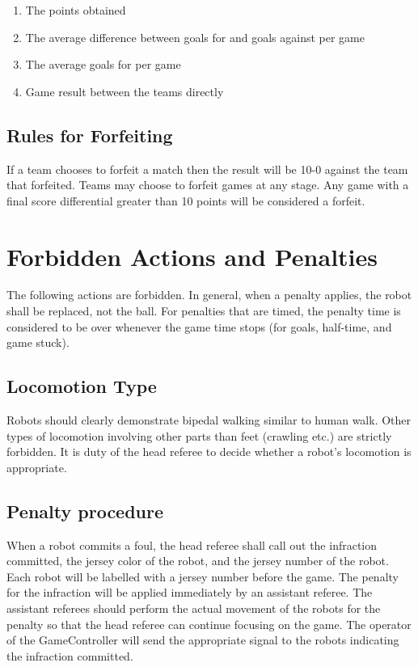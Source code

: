 \documentclass[12pt]{article}
\begin{document}
\begin{enumerate}
\item The points obtained
\item The average difference between goals for and goals against per game
\item The average goals for per game
\item Game result between the teams directly
\end{enumerate}


\subsection{Rules for Forfeiting}

If a team chooses to forfeit a match then the result will be 10-0 against the
team that forfeited. Teams may choose to forfeit games at any stage. Any game
with a final score differential greater than 10 points will be considered a forfeit.

\section{Forbidden Actions and Penalties}
\label{sec:forbidden_act}

The following actions are forbidden. In general, when a penalty
applies, the robot shall be replaced, not the ball.  For penalties
that are timed, the penalty time is considered to be over whenever
the game time stops (for goals, half-time, and game stuck).

\subsection{Locomotion Type}
\label{sec:locomotion_type}
Robots should clearly demonstrate bipedal walking similar to human walk. Other types of locomotion involving other parts than feet (crawling etc.) are strictly forbidden. It is duty of the head referee to decide whether a robot's locomotion is appropriate.

\subsection{Penalty procedure}
\label{sec:penalty_procedure}

When a robot commits a foul, the head referee shall call out the
infraction committed, the jersey color of the robot, and the jersey
number of the robot.  Each robot will be labelled with a jersey
number before the game.  The penalty for the infraction will be
applied immediately by an assistant referee.  The assistant referees
should perform the actual movement of the robots for the penalty so
that the head referee can continue focusing on the game.  The
operator of the GameController will send the appropriate signal to
the robots indicating the infraction committed.
\end{document}
